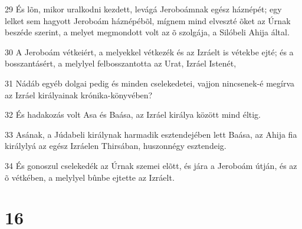 \par 29 És lõn, mikor uralkodni kezdett, levágá Jeroboámnak egész háznépét; egy lelket sem hagyott Jeroboám háznépébõl, mígnem mind elveszté õket az Úrnak beszéde szerint, a melyet megmondott volt az õ szolgája, a Silóbeli Ahija által.
\par 30 A Jeroboám vétkeiért, a melyekkel vétkezék és az Izráelt is vétekbe ejté; és a bosszantásért, a melylyel felbosszantotta az Urat, Izráel Istenét,
\par 31 Nádáb egyéb dolgai pedig és minden cselekedetei, vajjon nincsenek-é megírva az Izráel királyainak krónika-könyvében?
\par 32 És hadakozás volt Asa és Baása, az Izráel királya között mind éltig.
\par 33 Asának, a Júdabeli királynak harmadik esztendejében lett Baása, az Ahija fia királylyá az egész Izráelen Thirsában, huszonnégy esztendeig.
\par 34 És gonoszul cselekedék az Úrnak szemei elõtt, és jára a Jeroboám útján, és az õ vétkében, a melylyel bûnbe ejtette az Izráelt.

\chapter{16}

